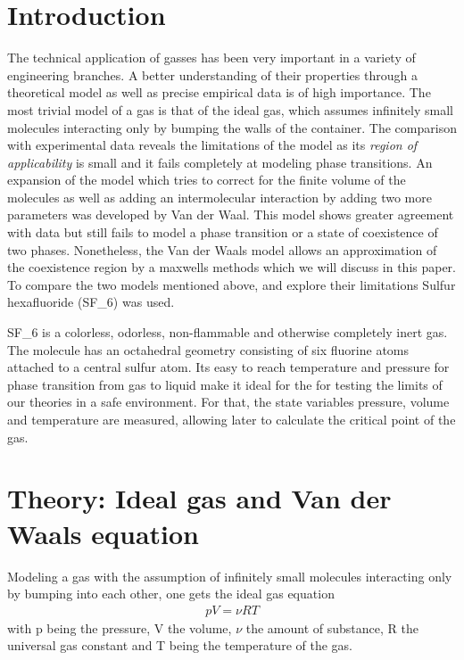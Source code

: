 \documentclass[a4paper,10pt,twocolumn]{article}
\begin{document}
    \section{Introduction}\label{sec:introdction}
    The technical application of gasses has been very important in a variety of engineering branches. 
    A better understanding of their properties through a  theoretical model as well as precise empirical data is of high importance.
    The most trivial model of a gas is that of the ideal gas, which assumes infinitely small molecules interacting only by bumping the walls of the container.
    The comparison with experimental data reveals the limitations of the model as its \textit{region of applicability} is small and it fails completely at modeling phase transitions.
    An expansion of the model which tries to correct for the finite volume of the molecules as well as adding an intermolecular interaction by adding two more parameters was developed by Van der Waal.
    This model shows greater agreement with data but still fails to model a phase transition or a state of coexistence of two phases.
    Nonetheless, the Van der Waals model allows an approximation of the coexistence region by a maxwells methods which we will discuss in this paper.
    To compare the two models mentioned above, and explore their limitations Sulfur hexafluoride (SF_6\)) was used.
    
    SF_6\) is a colorless, odorless, non-flammable and otherwise completely inert gas. 
    The molecule has an octahedral geometry consisting of six fluorine atoms attached to a central sulfur atom.
    Its easy to reach temperature and pressure for phase transition from gas to liquid make it ideal for the for testing the limits of our theories in a safe environment.
    For that, the state variables pressure, volume and temperature are measured, allowing later to calculate the critical point of the gas.
    \section{Theory: Ideal gas and Van der Waals equation}\label{sec:theory}
    Modeling a gas with the assumption of infinitely small molecules interacting only by bumping into each other, one gets the ideal gas equation
    \begin{align}
        pV=\nu RT
    \end{align}
    with p being the pressure, V the volume, $\nu$ the amount of substance, R the universal gas constant and T being the temperature of the gas.
    
\end{document}
